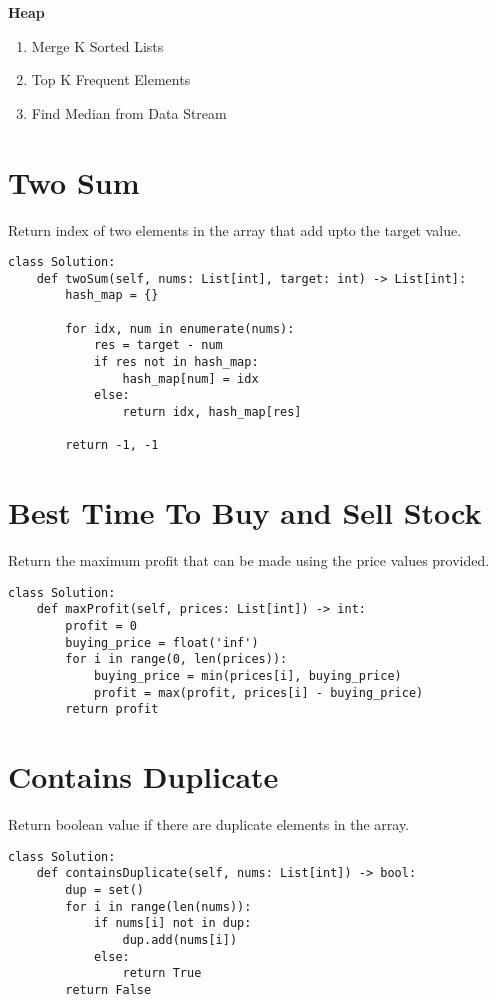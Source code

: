 \documentclass[24pt, a4]{article}
\begin{document}
\textbf{Heap}
\begin{enumerate}
    \item{Merge K Sorted Lists}
    \item{Top K Frequent Elements}
    \item{Find Median from Data Stream}
\end{enumerate}

\newpage
\section{Two Sum}
Return index of two elements in the array that add upto the target value.
\begin{lstlisting}
class Solution:
    def twoSum(self, nums: List[int], target: int) -> List[int]:
        hash_map = {}
        
        for idx, num in enumerate(nums):
            res = target - num
            if res not in hash_map:
                hash_map[num] = idx
            else:
                return idx, hash_map[res]
        
        return -1, -1
\end{lstlisting}

\section{Best Time To Buy and Sell Stock}
Return the maximum profit that can be made using the price values provided.
\begin{lstlisting}
class Solution:
    def maxProfit(self, prices: List[int]) -> int:
        profit = 0
        buying_price = float('inf')
        for i in range(0, len(prices)):
            buying_price = min(prices[i], buying_price)
            profit = max(profit, prices[i] - buying_price)
        return profit
\end{lstlisting}

\section{Contains Duplicate}
Return boolean value if there are duplicate elements in the array.
\begin{lstlisting}
class Solution:
    def containsDuplicate(self, nums: List[int]) -> bool:
        dup = set()
        for i in range(len(nums)):
            if nums[i] not in dup:
                dup.add(nums[i])
            else:
                return True
        return False
\end{lstlisting}
\end{document}
